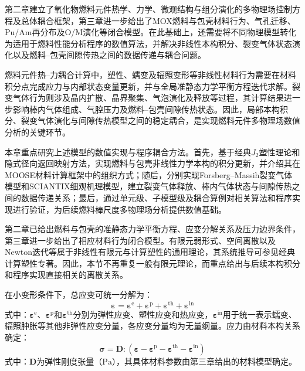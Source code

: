 

第二章建立了氧化物燃料元件热学、力学、微观结构与组分演化的多物理场控制方程及总体耦合框架，第三章进一步给出了MOX燃料与包壳材料行为、气孔迁移、Pu/Am再分布及O/M演化等闭合模型。在此基础上，还需要将不同物理模型转化为适用于燃料性能分析程序的数值算法，并解决非线性本构积分、裂变气体状态演化以及燃料--包壳间隙传热之间的数据传递与耦合问题。

燃料元件热--力耦合计算中，塑性、蠕变及辐照变形等非线性材料行为需要在材料积分点完成应力与内部状态变量更新，并与全局准静态力学平衡方程迭代求解。裂变气体行为则涉及晶内扩散、晶界聚集、气泡演化及释放等过程，其计算结果进一步影响棒内气体组成、气腔压力及燃料--包壳间隙传热状态。因此，局部本构积分、裂变气体演化与间隙传热模型之间的稳定耦合，是实现燃料元件多物理场数值分析的关键环节。

本章重点研究上述模型的数值实现与程序耦合方法。首先，基于经典$J_2$塑性理论和隐式径向返回映射方法，实现燃料与包壳非线性力学本构的积分更新，并介绍其在MOOSE材料计算框架中的组织方式；随后，分别实现Forsberg--Massih裂变气体模型和SCIANTIX细观机理模型，建立裂变气体释放、棒内气体状态与间隙传热之间的数据传递关系；最后，通过单元级、子模型级及耦合算例对相关算法和程序实现进行验证，为后续燃料棒尺度多物理场分析提供数值基础。

第二章已给出燃料与包壳的准静态力学平衡方程、应变分解关系及压力边界条件，第三章进一步给出了相应材料行为闭合模型。有限元弱形式、空间离散以及Newton迭代等属于非线性有限元与计算塑性的通用理论，其系统推导可参见经典计算塑性专著\cite{dunneIntroductionComputationalPlasticity2005}。因此，本节不再重复一般有限元理论，而重点给出与后续本构积分和程序实现直接相关的离散关系。

在小变形条件下，总应变可统一分解为：
\begin{equation}
	\boldsymbol{\varepsilon}
	=
	\boldsymbol{\varepsilon}^{\mathrm{e}}
	+
	\boldsymbol{\varepsilon}^{\mathrm{p}}
	+
	\boldsymbol{\varepsilon}^{\mathrm{th}}
	+
	\boldsymbol{\varepsilon}^{\mathrm{in}}
	\label{eq:ch4_strain_decomposition}
\end{equation}
\noindent 式中：$\boldsymbol{\varepsilon}^{\mathrm{e}}$、$\boldsymbol{\varepsilon}^{\mathrm{p}}$和$\boldsymbol{\varepsilon}^{\mathrm{th}}$分别为弹性应变、塑性应变和热应变，$\boldsymbol{\varepsilon}^{\mathrm{in}}$用于统一表示蠕变、辐照肿胀等其他非弹性应变分量，各应变分量均为无量纲量。应力由材料本构关系确定：
\begin{equation}
	\boldsymbol{\sigma}
	=
	\mathbf{D}:
	\left(
	\boldsymbol{\varepsilon}
	-\boldsymbol{\varepsilon}^{\mathrm{p}}
	-\boldsymbol{\varepsilon}^{\mathrm{th}}
	-\boldsymbol{\varepsilon}^{\mathrm{in}}
	\right)
	\label{eq:ch4_constitutive_relation}
\end{equation}
\noindent 式中：$\mathbf{D}$为弹性刚度张量（$\mathrm{Pa}$），其具体材料参数由第三章给出的材料模型确定。

